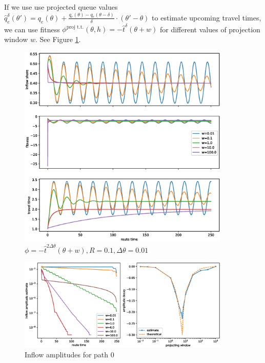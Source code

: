 \documentclass[12pt]{article}
\begin{document}
If we use use projected queue values $\hat{q}^{\delta}_e(\theta') = q_e(\theta) + \frac{q_e(\theta) - q_e(\theta - \delta)}{\delta} \cdot (\theta' - \theta)$ to estimate upcoming travel times, we can use fitness $ \phi^{\text{proj t.t.}}(\theta, h) = - \hat{t}^{\delta} ( \theta + w) $ for different values of projection window $w$. See Figure \ref{fig:fluctuations_proj}.	

\begin{figure}
	\includegraphics[width=0.9\textwidth]{img/replicator_proj_tt.eps}
	\caption{ $ \phi = -\hat{t}^{2\Delta \theta}(\theta + w), R=0.1, \Delta \theta = 0.01$}
	\label{fig:fluctuations_proj}

\end{figure}
	
\begin{figure}
	\includegraphics[width=0.9\textwidth]{img/amplitudes_proj_tt.eps}
	\caption{ Inflow amplitudes for path 0 }
	\label{fig:amplitudes_proj}

\end{figure}
\end{document}
